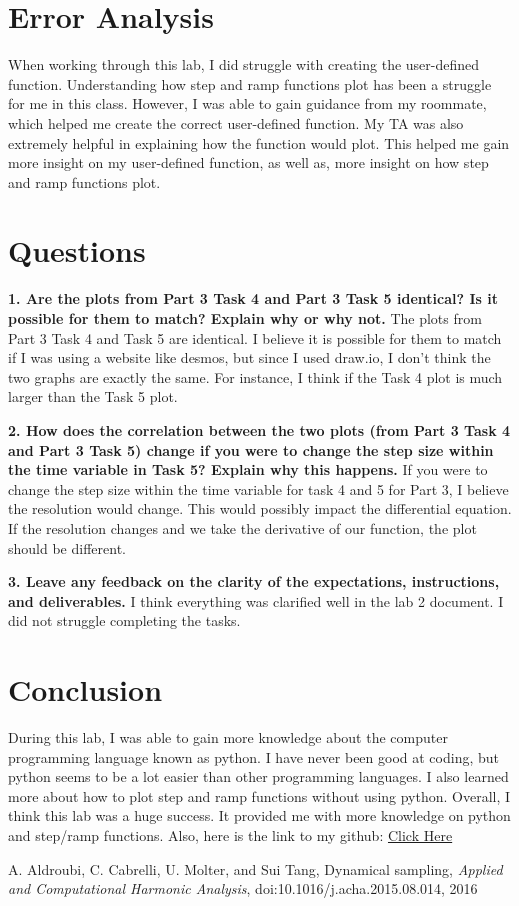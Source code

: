 \documentclass[12pt]{report}
\begin{document}
\newpage

\section{Error Analysis}

When working through this lab, I did struggle with creating the user-defined function. Understanding how step and ramp functions plot has been a struggle for me in this class. However, I was able to gain guidance from my roommate, which helped me create the correct user-defined function. My TA was also extremely helpful in explaining how the function would plot. This helped me gain more insight on my user-defined function, as well as, more insight on how step and ramp functions plot. 



\section{Questions}

\textbf{1. Are the plots from Part 3 Task 4 and Part 3 Task 5 identical? Is it possible for them to
match? Explain why or why not.}
{The plots from Part 3 Task 4 and Task 5 are identical. I believe it is possible for them to match if I was using a website like desmos, but since I used draw.io, I don't think the two graphs are exactly the same. For instance, I think if the Task 4 plot is much larger than the Task 5 plot.}

\textbf{2. How does the correlation between the two plots (from Part 3 Task 4 and Part 3 Task 5)
change if you were to change the step size within the time variable in Task 5? Explain why
this happens.}
{If you were to change the step size within the time variable for task 4 and 5 for Part 3, I believe the resolution would change. This would possibly impact the differential equation. If the resolution changes and we take the derivative of our function, the plot should be different.  }

\textbf{3. Leave any feedback on the clarity of the expectations, instructions, and deliverables.}
{I think everything was clarified well in the lab 2 document. I did not struggle completing the tasks.}

\newpage

\section{Conclusion}

During this lab, I was able to gain more knowledge about the computer programming language known as python. I have never been good at coding, but python seems to be a lot easier than other programming languages. I also learned more about how to plot step and ramp functions without using python. Overall, I think this lab was a huge success. It provided me with more knowledge on python and step/ramp functions. Also, here is the link to my github: \href{https://github.com/JMac1999}{Click Here}

\newpage


\begin{thebibliography}{111}

A. Aldroubi, C. Cabrelli, U. Molter, and Sui Tang,
Dynamical sampling, 
{\it  Applied and Computational Harmonic Analysis}, doi:10.1016/j.acha.2015.08.014, 2016


\end{thebibliography}
\end{document}
